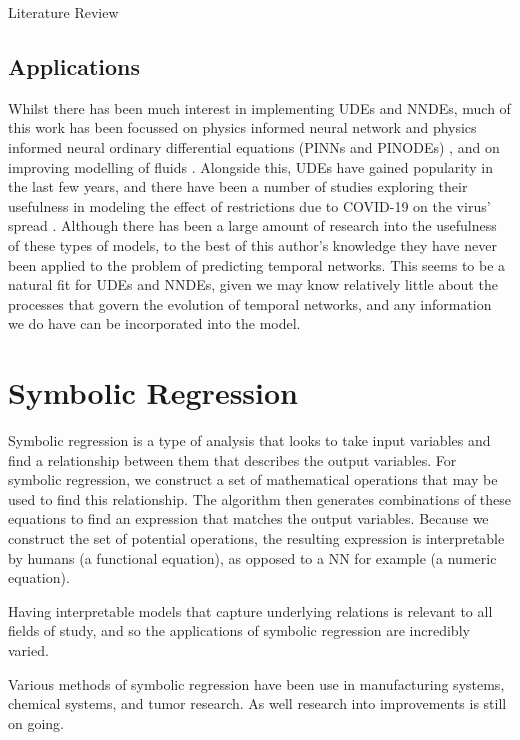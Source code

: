 \documentclass[12pt]{amsbook}
\begin{document}
\begin{chapter}{Literature Review}
        \subsection{Applications}
            Whilst there has been much interest in implementing UDEs and NNDEs, much of this work has been focussed on physics informed neural network and physics informed neural ordinary differential equations (PINNs and PINODEs) \cite{karniadakis2021physics,GAO2021110079,krishnapriyan2021characterizing,roehrl2020modeling}, and on improving modelling of fluids \cite{mahmoudabadbozchelou2021data,nguyen2022physics}. Alongside this, UDEs have gained popularity in the last few years, and there have been a number of studies exploring their usefulness in modeling the effect of restrictions due to COVID-19 on the virus' spread \cite{Dandekar2020.04.03.20052084}. Although there has been a large amount of research into the usefulness of these types of models, to the best of this author's knowledge they have never been applied to the problem of predicting temporal networks. This seems to be a natural fit for UDEs and NNDEs, given we may know relatively little about the processes that govern the evolution of temporal networks, and any information we do have can be incorporated into the model.

    \section{Symbolic Regression}
        Symbolic regression is a type of analysis that looks to take input variables and find a relationship between them that describes the output variables. For symbolic regression, we construct a set of mathematical operations that may be used to find this relationship. The algorithm then generates combinations of these equations to find an expression that matches the output variables. Because we construct the set of potential operations, the resulting expression is interpretable by humans (a functional equation), as opposed to a NN for example (a numeric equation). 

        Having interpretable models that capture underlying relations is relevant to all fields of study, and so the applications of symbolic regression are incredibly varied. 

        Various methods of symbolic regression have been use in manufacturing systems, chemical systems, and tumor research\cite{can2011comparison,keith2021combining,yoshihara2013inferring}. As well research into improvements is still on going.


\end{chapter}
\end{document}
